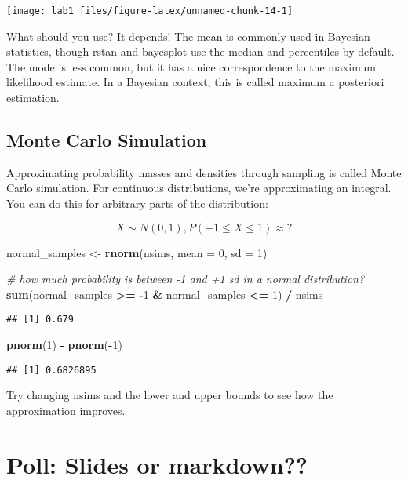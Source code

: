\documentclass[]{article}
\newenvironment{Shaded}{\begin{snugshade}}{\end{snugshade}}
\newcommand{\KeywordTok}[1]{\textcolor[rgb]{0.13,0.29,0.53}{\textbf{#1}}}
\newcommand{\DataTypeTok}[1]{\textcolor[rgb]{0.13,0.29,0.53}{#1}}
\newcommand{\DecValTok}[1]{\textcolor[rgb]{0.00,0.00,0.81}{#1}}
\newcommand{\StringTok}[1]{\textcolor[rgb]{0.31,0.60,0.02}{#1}}
\newcommand{\CommentTok}[1]{\textcolor[rgb]{0.56,0.35,0.01}{\textit{#1}}}
\newcommand{\OperatorTok}[1]{\textcolor[rgb]{0.81,0.36,0.00}{\textbf{#1}}}
\newcommand{\NormalTok}[1]{#1}
\begin{document}
\begin{center}\texttt{[image: lab1\_files/figure-latex/unnamed-chunk-14-1]} \end{center}

What should you use? It depends! The mean is commonly used in Bayesian
statistics, though rstan and bayesplot use the median and percentiles by
default. The mode is less common, but it has a nice correspondence to
the maximum likelihood estimate. In a Bayesian context, this is called
maximum a posteriori estimation.

\subsection{Monte Carlo Simulation}\label{monte-carlo-simulation}

Approximating probability masses and densities through sampling is
called Monte Carlo simulation. For continuous distributions, we're
approximating an integral. You can do this for arbitrary parts of the
distribution:

\[X \sim N(0,1), P(-1 \leq X \leq 1) \approx ?\]

\begin{Shaded}
\begin{Highlighting}[]
\NormalTok{normal_samples <-}\StringTok{ }\KeywordTok{rnorm}\NormalTok{(nsims, }\DataTypeTok{mean =} \DecValTok{0}\NormalTok{, }\DataTypeTok{sd =} \DecValTok{1}\NormalTok{)}

\CommentTok{# how much probability is between -1 and +1 sd in a normal distribution?}
\KeywordTok{sum}\NormalTok{(normal_samples }\OperatorTok{>=}\StringTok{ }\OperatorTok{-}\DecValTok{1} \OperatorTok{&}\StringTok{ }\NormalTok{normal_samples }\OperatorTok{<=}\StringTok{ }\DecValTok{1}\NormalTok{) }\OperatorTok{/}\StringTok{ }\NormalTok{nsims}
\end{Highlighting}
\end{Shaded}

\begin{verbatim}
## [1] 0.679
\end{verbatim}

\begin{Shaded}
\begin{Highlighting}[]
\KeywordTok{pnorm}\NormalTok{(}\DecValTok{1}\NormalTok{) }\OperatorTok{-}\StringTok{ }\KeywordTok{pnorm}\NormalTok{(}\OperatorTok{-}\DecValTok{1}\NormalTok{)}
\end{Highlighting}
\end{Shaded}

\begin{verbatim}
## [1] 0.6826895
\end{verbatim}

Try changing nsims and the lower and upper bounds to see how the
approximation improves.

\section{Poll: Slides or markdown??}\label{poll-slides-or-markdown}
\end{document}
